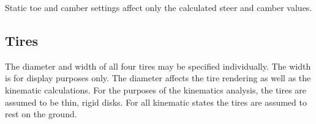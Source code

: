 Static toe and camber settings affect only the calculated steer and camber values.

\subsection{Tires} \label{ssec:tires}

The diameter and width of all four tires may be specified individually.  The width is for display purposes only.  The diameter affects the tire rendering as well as the kinematic calculations.  For the purposes of the kinematics analysis, the tires are assumed to be thin, rigid disks.  For all kinematic states the tires are assumed to rest on the ground.
